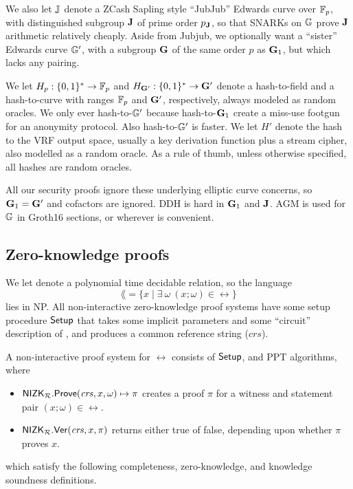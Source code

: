 We also let ${\mathbb{J}}$ denote a ZCash Sapling style ``JubJub'' Edwards curve
over $\mathbb{F}_p$, with distinguished subgroup ${\mathbf{J}}$ of prime order $p_{\mathbf{J}}$, so that
SNARKs on ${\mathbb{G}}$ prove ${\mathbf{J}}$ arithmetic relatively cheaply.
Aside from Jubjub, we optionally want a ``sister'' Edwards curve ${\mathbb{G}'}$,
with a subgroup ${\mathbf{G}}$ of the same order $p$ as ${\mathbf{G}}_1$,
 but which lacks any pairing.

We let $H_p : \{0,1\}^* \to \mathbb{F}_p$ and $H_{{\mathbf{G}'}} : \{0,1\}^* \to {\mathbf{G}'}$
denote a hash-to-field and a hash-to-curve  with ranges
$\mathbb{F}_p$ and ${\mathbf{G}'}$, respectively, always modeled as random oracles.  
We only ever hash-to-${\mathbb{G}'}$ because hash-to-${\mathbf{G}}_1$ create a miss-use
footgun for an anonymity protocol.  Also hash-to-${\mathbb{G}'}$ is faster.
We let $H'$ denote the hash to the VRF output space, usually a key derivation 
function plus a stream cipher, also modelled as a random oracle. As a rule of thumb, 
unless otherwise specified, all hashes are random oracles. 

All our security proofs ignore these underlying elliptic curve concerns,
so ${\mathbf{G}}_1 = {\mathbf{G}'}$ and cofactors are ignored. DDH is hard in ${\mathbf{G}}_1$ and ${\mathbf{J}}$.
AGM is used for ${\mathbb{G}}$ in Groth16 sections, or wherever is convenient. 

\subsection{Zero-knowledge proofs}
\label{subsec:zkp_background}

% 

We let \rel denote a polynomial time decidable relation, so the language
$$\lang = \{x \mid \exists \ \omega \ (x; \omega) \in \rel \}$$ lies in NP.
All non-interactive zero-knowledge proof systems have some setup procedure
${\mathsf{Setup}}$ that takes some implicit parameters and some ``circuit''
description of \rel, and produces a common reference string ($\mathit{crs}$).

A non-interactive proof system for $\rel$ consists of ${\mathsf{Setup}}$, \Prove and \Verify PPT algorithms, where
\begin{itemize}
\item ${\mathsf{NIZK}}_\mathcal{R}.{\mathsf{Prove}}(\mathit{crs}, x, \omega) \mapsto \pi$ creates a proof $\pi$ for a witness and statement pair $(x; \omega) \in \rel$.
\item ${\mathsf{NIZK}}_\mathcal{R}.{\mathsf{Ver}}(\mathit{crs}, x, \pi)$ returns either true of false, depending upon whether $\pi$  proves $x$.
\end{itemize}	
which satisfy the following completeness, zero-knowledge, and knowledge soundness definitions.

